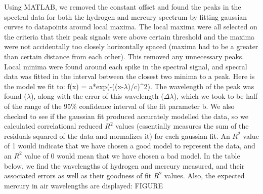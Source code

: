 \documentclass{article}
\begin{document}
    Using MATLAB, we removed the constant offset and found the peaks in the spectral data for both the hydrogen and mercury spectrum by fitting gaussian curves to datapoints around local maxima. The local maxima were all selected on the criteria that their peak signals were above certain threshold and the maxima were not accidentally too closely horizontally spaced (maxima had to be a greater than certain distance from each other). This removed any unnecessary peaks. Local minima were found around each spike in the spectral signal, and specral data was fitted in the interval between the closest two minima to a peak. Here is the model we fit to: f(x) =  a*exp(-((x-$\lambda$)/c)\^{}2). The wavelength of the peak was found ($\lambda$), along with the error of this wavelength ($\Delta \lambda$), which we took to be half of the range of the 95$\%$ confidence interval of the fit parameter b. We also checked to see if the gaussian fit produced accurately modelled the data, so we calculated correlational reduced $R^{2}$ values (essentially measures the sum of the residuals squared of the data and normalizes it) for each gaussian fit. An $R^{2}$ value of 1 would indicate that we have chosen a good model to represent the data, and an $R^{2}$ value of 0 would mean that we have chosen a bad model. In the table below, we find the wavelengths of hydrogen and mercury measured, and their associated errors as well as their goodness of fit $R^{2}$ values. Also, the expected mercury in air wavelengths are displayed:
    FIGURE
    
\end{document}
